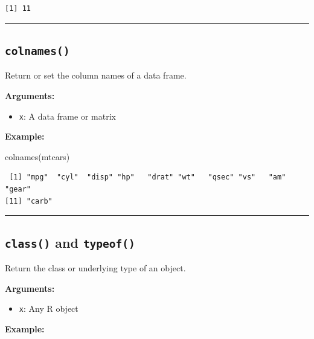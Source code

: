 \documentclass[
  letterpaper,
  DIV=11,
  numbers=noendperiod]{scrreprt}
\newenvironment{Shaded}{\begin{snugshade}}{\end{snugshade}}
\newcommand{\FunctionTok}[1]{\textcolor[rgb]{0.28,0.35,0.67}{#1}}
\newcommand{\NormalTok}[1]{\textcolor[rgb]{0.00,0.23,0.31}{#1}}
\newcommand{\SpecialCharTok}[1]{\textcolor[rgb]{0.37,0.37,0.37}{#1}}
\providecommand{\tightlist}{%
  \setlength{\itemsep}{0pt}\setlength{\parskip}{0pt}}
\begin{document}
\begin{verbatim}
[1] 11
\end{verbatim}

\begin{center}\rule{0.5\linewidth}{0.5pt}\end{center}

\subsection{\texorpdfstring{\texttt{colnames()}}{colnames()}}\label{colnames}

Return or set the column names of a data frame.

\textbf{Arguments:}

\begin{itemize}
\tightlist
\item
  \texttt{x}: A data frame or matrix
\end{itemize}

\textbf{Example:}

\begin{Shaded}
\begin{Highlighting}[]
\FunctionTok{colnames}\NormalTok{(mtcars)}
\end{Highlighting}
\end{Shaded}

\begin{verbatim}
 [1] "mpg"  "cyl"  "disp" "hp"   "drat" "wt"   "qsec" "vs"   "am"   "gear"
[11] "carb"
\end{verbatim}

\begin{center}\rule{0.5\linewidth}{0.5pt}\end{center}

\subsection{\texorpdfstring{\texttt{class()} and
\texttt{typeof()}}{class() and typeof()}}\label{class-and-typeof}

Return the class or underlying type of an object.

\textbf{Arguments:}

\begin{itemize}
\tightlist
\item
  \texttt{x}: Any R object
\end{itemize}

\textbf{Example:}

\begin{Shaded}
\end{Shaded}
\end{document}
